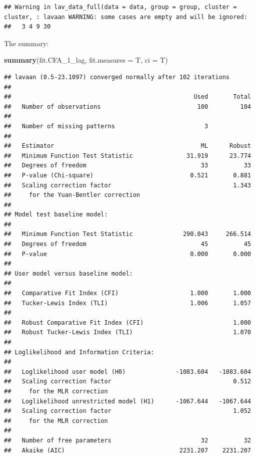 \documentclass[]{article}
\newenvironment{Shaded}{\begin{snugshade}}{\end{snugshade}}
\newcommand{\KeywordTok}[1]{\textcolor[rgb]{0.13,0.29,0.53}{\textbf{#1}}}
\newcommand{\DataTypeTok}[1]{\textcolor[rgb]{0.13,0.29,0.53}{#1}}
\newcommand{\NormalTok}[1]{#1}
\begin{document}
\begin{verbatim}
## Warning in lav_data_full(data = data, group = group, cluster = cluster, : lavaan WARNING: some cases are empty and will be ignored:
##   3 4 9 30
\end{verbatim}

The summary:

\begin{Shaded}
\begin{Highlighting}[]
\KeywordTok{summary}\NormalTok{(fit.CFA_1_lag, }
        \DataTypeTok{fit.measures =}\NormalTok{ T,}
        \DataTypeTok{ci =}\NormalTok{ T)}
\end{Highlighting}
\end{Shaded}

\begin{verbatim}
## lavaan (0.5-23.1097) converged normally after 102 iterations
## 
##                                                   Used       Total
##   Number of observations                           100         104
## 
##   Number of missing patterns                         3
## 
##   Estimator                                         ML      Robust
##   Minimum Function Test Statistic               31.919      23.774
##   Degrees of freedom                                33          33
##   P-value (Chi-square)                           0.521       0.881
##   Scaling correction factor                                  1.343
##     for the Yuan-Bentler correction
## 
## Model test baseline model:
## 
##   Minimum Function Test Statistic              290.043     266.514
##   Degrees of freedom                                45          45
##   P-value                                        0.000       0.000
## 
## User model versus baseline model:
## 
##   Comparative Fit Index (CFI)                    1.000       1.000
##   Tucker-Lewis Index (TLI)                       1.006       1.057
## 
##   Robust Comparative Fit Index (CFI)                         1.000
##   Robust Tucker-Lewis Index (TLI)                            1.070
## 
## Loglikelihood and Information Criteria:
## 
##   Loglikelihood user model (H0)              -1083.604   -1083.604
##   Scaling correction factor                                  0.512
##     for the MLR correction
##   Loglikelihood unrestricted model (H1)      -1067.644   -1067.644
##   Scaling correction factor                                  1.052
##     for the MLR correction
## 
##   Number of free parameters                         32          32
##   Akaike (AIC)                                2231.207    2231.207

\end{verbatim}
\end{document}
